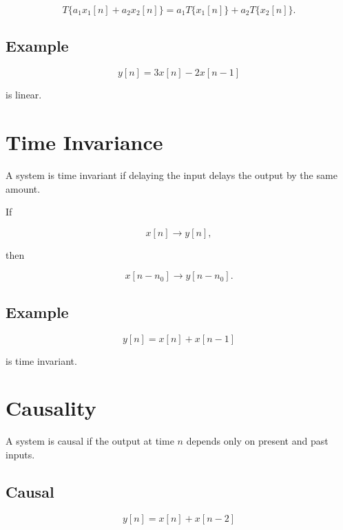 \[
T\{a_1x_1[n]+a_2x_2[n]\}
=
a_1T\{x_1[n]\}+a_2T\{x_2[n]\}.
\]


\subsection{Example}

\[
y[n]=3x[n]-2x[n-1]
\]

is linear.


\section{Time Invariance}

A system is time invariant if delaying the input delays the output by the same amount.

If

\[
x[n]\rightarrow y[n],
\]

then

\[
x[n-n_0]\rightarrow y[n-n_0].
\]


\subsection{Example}

\[
y[n]=x[n]+x[n-1]
\]

is time invariant.


\section{Causality}

A system is causal if the output at time \(n\) depends only on present and past inputs.


\subsection{Causal}

\[
y[n]=x[n]+x[n-2]
\]

